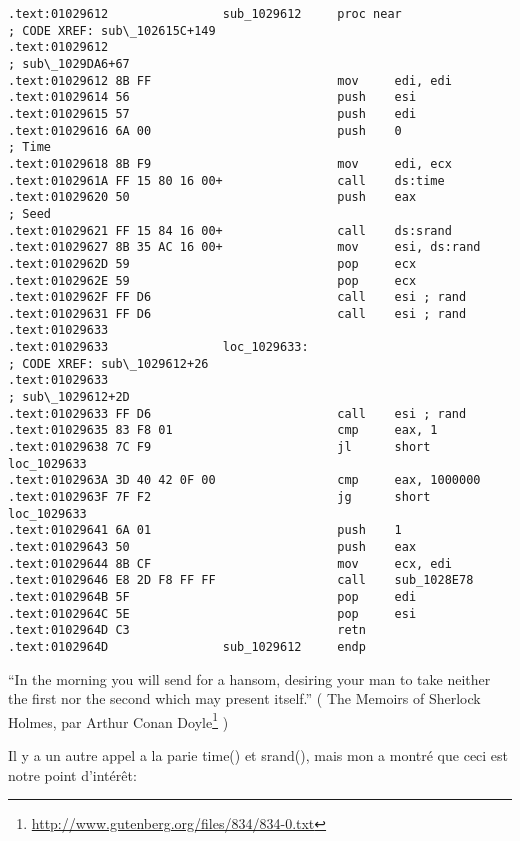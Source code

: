 \begin{lstlisting}[style=customasmx86]
.text:01029612                sub_1029612     proc near               ; CODE XREF: sub\_102615C+149
.text:01029612                                                        ; sub\_1029DA6+67
.text:01029612 8B FF                          mov     edi, edi
.text:01029614 56                             push    esi
.text:01029615 57                             push    edi
.text:01029616 6A 00                          push    0               ; Time
.text:01029618 8B F9                          mov     edi, ecx
.text:0102961A FF 15 80 16 00+                call    ds:time
.text:01029620 50                             push    eax             ; Seed
.text:01029621 FF 15 84 16 00+                call    ds:srand
.text:01029627 8B 35 AC 16 00+                mov     esi, ds:rand
.text:0102962D 59                             pop     ecx
.text:0102962E 59                             pop     ecx
.text:0102962F FF D6                          call    esi ; rand
.text:01029631 FF D6                          call    esi ; rand
.text:01029633
.text:01029633                loc_1029633:                            ; CODE XREF: sub\_1029612+26
.text:01029633                                                        ; sub\_1029612+2D
.text:01029633 FF D6                          call    esi ; rand
.text:01029635 83 F8 01                       cmp     eax, 1
.text:01029638 7C F9                          jl      short loc_1029633
.text:0102963A 3D 40 42 0F 00                 cmp     eax, 1000000
.text:0102963F 7F F2                          jg      short loc_1029633
.text:01029641 6A 01                          push    1
.text:01029643 50                             push    eax
.text:01029644 8B CF                          mov     ecx, edi
.text:01029646 E8 2D F8 FF FF                 call    sub_1028E78
.text:0102964B 5F                             pop     edi
.text:0102964C 5E                             pop     esi
.text:0102964D C3                             retn
.text:0102964D                sub_1029612     endp
\end{lstlisting}


``In the morning you will send for a hansom, desiring your man to take neither the first nor the second which may present itself.''
( The Memoirs of Sherlock Holmes, par Arthur Conan Doyle\footnote{\url{http://www.gutenberg.org/files/834/834-0.txt}} )

Il y a un autre appel a la parie time() et srand(), mais mon \tracer a montré
que ceci est notre point d'intérêt:

